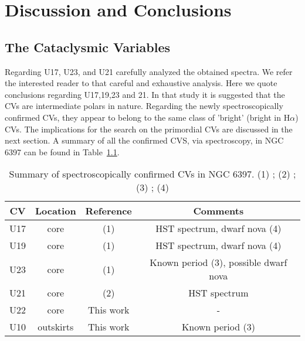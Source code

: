 \chapter{Discussion and Conclusions}\label{chap:conclu}
\thispagestyle{fancy}

\section{The Cataclysmic Variables}


Regarding U17, U23, and U21 \cite{edmonds_cataclysmic_1999} carefully analyzed the obtained spectra. We refer the interested reader to that careful and exhaustive analysis. Here we quote \citealt{edmonds_cataclysmic_1999} conclusions regarding U17,19,23 and 21. In that study it is suggested that the CVs are intermediate polars in nature.  Regarding the newly spectroscopically confirmed CVs, they appear to belong to the same class of 'bright' (bright in H$\alpha$) CVs. The implications for the search on the primordial CVs are discussed in the next section. A summary of all the confirmed CVS, via spectroscopy, in NGC 6397 can be found in Table~\ref{tab:sum}.


\begin{comment}
U17 CV3 -- Dwarf Nova
U19 CV2 -- Dwarf Nova
U23 CV1
U21 CV4
U10 CV6
U22 CV5
observed to undergo dwarf nova (DN ) eruptions with amplitudes
of at least 1.8 and 2.7 mag.
\end{comment}

\begin{table}[]
        \centering
\begin{tabular}{|c|c|c|c|}
\hline
\textbf{CV} & \textbf{Location} &  \textbf{Reference} & \textbf{Comments}\\ \hline
U17 & core  &  (1) & HST spectrum, dwarf nova (4)           \\ \hline
U19 & core  &  (1) & HST spectrum, dwarf nova (4)           \\ \hline
U23         & core   & (1)                       &  Known period (3), possible dwarf nova             \\ \hline

U21         & core  & (2)   & HST spectrum                            \\ \hline
U22         & core                       & This work                         &   -                         \\ \hline
U10         & outskirts                        & This work                      &  Known period (3)              \\ \hline
\end{tabular}
\caption[Summary of spectroscopically confirmed CVs in NGC 6397]{Summary of spectroscopically confirmed  CVs in NGC 6397. (1) \citealt{grindlay_spectroscopic_1995}; (2) \citealt{edmonds_cataclysmic_1999}; (3) \citealt{kaluzny_time_2003}; (4) \citep{shara_erupting_2005} }
\label{tab:sum}
\end{table}

